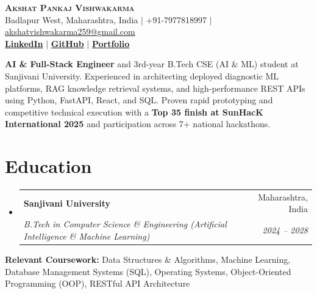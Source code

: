\documentclass[letterpaper,10.8pt]{article}
\makeatletter
\newcommand{\resumeSubheading}[4]{
  \vspace{-1.5pt}\item
    \begin{tabular*}{0.97\textwidth}[t]{l@{\extracolsep{\fill}}r}
      \textbf{#1} & #2 \\
      \textit{\small#3} & \textit{\small #4} \\
    \end{tabular*}\vspace{-5pt}
}
\newcommand{\resumeSubHeadingListStart}{\begin{itemize}[leftmargin=0.15in, label={}]}
\newcommand{\resumeSubHeadingListEnd}{\end{itemize}}
\makeatother
\begin{document}
\begin{center}
    {\Huge \scshape \bfseries Akshat Pankaj Vishwakarma} \\ \vspace{2pt}
    \small Badlapur West, Maharashtra, India $|$ +91-7977818997 $|$ \href{mailto:akshatvishwakarma259@gmail.com}{\color{accent}akshatvishwakarma259@gmail.com} \\ \vspace{1pt}
    \href{https://linkedin.com/in/akshat-pankaj-vishwakarma-8a4246327}{\color{accent}\textbf{LinkedIn}} $|$
    \href{https://github.com/Akshat-vishwakarm}{\color{accent}\textbf{GitHub}} $|$
    \href{https://portfolio-akshat-vishwakarm.vercel.app}{\color{accent}\textbf{Portfolio}}
\end{center}

\vspace{-6pt}
\small{\textbf{AI \& Full-Stack Engineer} and 3rd-year B.Tech CSE (AI \& ML) student at Sanjivani University. Experienced in architecting deployed diagnostic ML platforms, RAG knowledge retrieval systems, and high-performance REST APIs using Python, FastAPI, React, and SQL. Proven rapid prototyping and competitive technical execution with a \textbf{Top 35 finish at SunHacK International 2025} and participation across 7+ national hackathons.}
\vspace{2pt}

\section{Education}
  \resumeSubHeadingListStart
    \resumeSubheading
      {Sanjivani University}{Maharashtra, India}
      {B.Tech in Computer Science \& Engineering (Artificial Intelligence \& Machine Learning)}{2024 -- 2028}
  \resumeSubHeadingListEnd
  \vspace{-5pt}
  \hspace{0.15in}\small{\textbf{Relevant Coursework:} Data Structures \& Algorithms, Machine Learning, Database Management Systems (SQL), Operating Systems, Object-Oriented Programming (OOP), RESTful API Architecture}
  \vspace{3pt}

\end{document}

